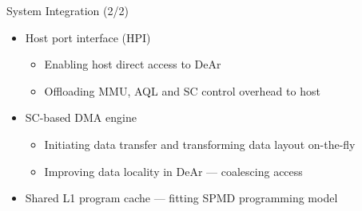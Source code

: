 \documentclass{beamer}
\begin{document}
\begin{CJK}{UTF8}{bkai}
    \begin{frame}{System Integration (2/2)}
        \begin{itemize}
            \item Host port interface (HPI)
                \begin{itemize}
                    \item Enabling host direct access to DeAr
                    \item Offloading MMU, AQL and SC control overhead to host
                \end{itemize}
            \item SC-based DMA engine
                \begin{itemize}
                    \item Initiating data transfer and transforming data layout on-the-fly
                    \item Improving data locality in DeAr --- coalescing access
                \end{itemize}
            \item Shared L1 program cache --- fitting SPMD programming model
        \end{itemize}
    \end{frame}


\end{CJK}
\end{document}
